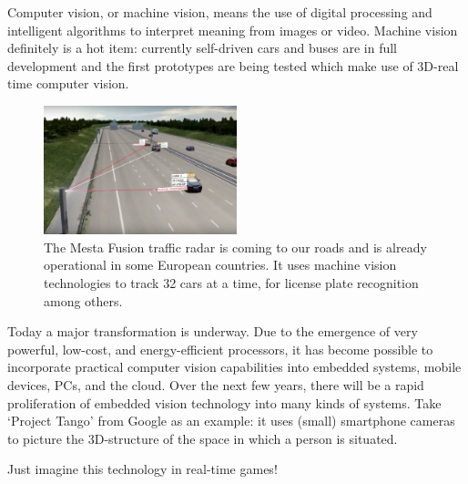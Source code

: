 Computer vision, or machine vision, means the use of digital processing and intelligent algorithms to interpret meaning from images or video. Machine vision definitely is a hot item: currently self-driven cars and buses are in full development and the first prototypes are being tested which make use of 3D-real time computer vision. 




\begin{figure}
	\centering
	\includegraphics[width=0.5\textwidth]{../figures/Mesta-Fusion}
	\caption{The Mesta Fusion traffic radar is coming to our roads and is already operational in some European countries. It uses machine vision technologies to track 32 cars at a time, for license plate recognition among others. \label{fig:flitspaal}}
\end{figure}
Today a major transformation is underway. Due to the emergence of very powerful, low-cost, and energy-efficient processors, it has become possible to incorporate practical computer vision capabilities into embedded systems, mobile devices, PCs, and the cloud. Over the next few years, there will be a rapid proliferation of embedded vision technology into many kinds of systems. Take `Project Tango' from Google as an example: it uses (small) smartphone cameras to picture the 3D-structure of the space in which a person is situated. 

Just imagine this technology in real-time games!



